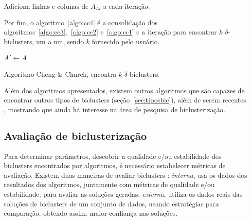 \documentclass[normaltoc, espacoumemeio, pnumromarab,ruledheader]{abnt}
\begin{document}
    \begin{algorithm}[h]
    \label{algo:cc3}
     \caption{Adiciona linhas e colunas de $A_{IJ}$ a cada iteração.}
    \end{algorithm}

    Por fim, o algoritmo~\ref{algo:cc4} é a consolidação dos algoritmos~\ref{algo:cc3},~\ref{algo:cc2} e~\ref{algo:cc1} e a iteração para encontrar $k$ $\delta$-biclusters, um a um, sendo $k$ fornecido pelo usuário.

    \begin{algorithm}[h]
    \label{algo:cc4}
     $A' \leftarrow A$\;
     \caption{Algoritmo Cheng \& Church, encontra $k$ $\delta$-biclusters.}
    \end{algorithm}


    Além dos algoritmos apresentados, existem outros algoritmos que são capazes de encontrar outros tipos de biclusters (seção~\ref{sec:tiposbic}), além de serem recentes \cite{Yang2013,Hochreiter2010,Cabanes2012}, mostrando que ainda há interesse na área de pesquisa de biclusterização.
    
     \subsection{Avaliação de biclusterização}

    Para determinar parâmetros, descobrir a qualidade e/ou estabilidade dos biclusters encontrados por algoritmos, é necessário estabelecer métricas de avaliação. Existem duas maneiras de avaliar biclusters \cite{Hochreiter2010}: \textit{interna}, usa os dados dos resultados dos algoritmos, juntamente com métricas de qualidade e/ou estabilidade, para avaliar as soluções geradas; \textit{externa}, utiliza os dados reais das soluções de biclusters de um conjunto de dados, usando estratégias para comparação, obtendo assim, maior confiança nas soluções.
\end{document}
